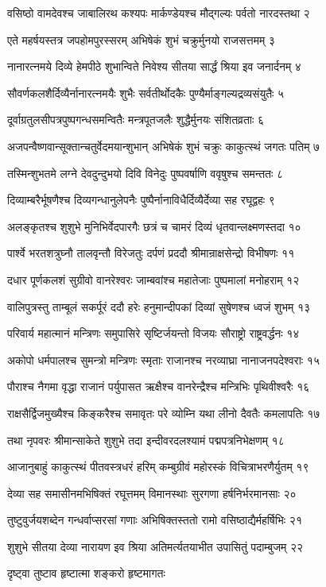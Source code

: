 वसिष्ठो वामदेवश्च जाबालिरथ कश्यपः
मार्कण्डेयश्च मौद्गल्यः पर्वतो नारदस्तथा २

एते महर्षयस्तत्र जपहोमपुरस्सरम्
अभिषेकं शुभं चक्रुर्मुनयो राजसत्तमम् ३

नानारत्नमये दिव्ये हेमपीठे शुभान्विते
निवेश्य सीतया सार्द्धं श्रिया इव जनार्दनम् ४

सौवर्णकलशैर्दिव्यैर्नानारत्नमयैः शुभैः
सर्वतीर्थोदकैः पुण्यैर्माङ्गल्यद्रव्यसंयुतैः ५

दूर्वाग्रतुलसीपत्रपुष्पगन्धसमन्वितैः
मन्त्रपूतजलैः शुद्धैर्मुनयः संशितव्रताः ६

अजपन्वैष्णवान्सूक्तान्चतुर्वेदमयान्शुभान्
अभिषेकं शुभं चक्रुः काकुत्स्थं जगतः पतिम् ७

तस्मिन्शुभतमे लग्ने देवदुन्दुभयो दिवि
विनेदुः पुष्पवर्षाणि ववृषुश्च समन्ततः ८

दिव्याम्बरैर्भूषणैश्च दिव्यगन्धानुलेपनैः
पुष्पैर्नानाविधैर्दिव्यैर्देव्या सह रघूद्वहः ९

अलङ्कृतश्च शुशुभे मुनिभिर्वेदपारगैः
छत्रं च चामरं दिव्यं धृतवान्लक्ष्मणस्तदा १०

पार्श्वे भरतशत्रुघ्नौ तालवृन्तौ विरेजतुः
दर्पणं प्रददौ श्रीमान्राक्षसेन्द्रो विभीषणः ११

दधार पूर्णकलशं सुग्रीवो वानरेश्वरः
जाम्बवांश्च महातेजाः पुष्पमालां मनोहराम् १२

वालिपुत्रस्तु ताम्बूलं सकर्पूरं ददौ हरेः
हनुमान्दीपकां दिव्यां सुषेणश्च ध्वजं शुभम् १३

परिवार्य महात्मानं मन्त्रिणः समुपासिरे
सृष्टिर्जयन्तो विजयः सौराष्ट्रो राष्ट्रवर्द्धनः १४

अकोपो धर्मपालश्च सुमन्त्रो मन्त्रिणः स्मृताः
राजानश्च नरव्याघ्रा नानाजनपदेश्वराः १५

पौराश्च नैगमा वृद्धा राजानं पर्युपासत
ऋक्षैश्च वानरेन्द्रैश्च मन्त्रिभिः पृथिवीश्वरैः १६

राक्षसैर्द्विजमुख्यैश्च किङ्करैश्च समावृतः
परे व्योम्नि यथा लीनो दैवतैः कमलापतिः १७

तथा नृपवरः श्रीमान्साकेते शुशुभे तदा
इन्दीवरदलश्यामं पद्मपत्रनिभेक्षणम् १८

आजानुबाहुं काकुत्स्थं पीतवस्त्रधरं हरिम्
कम्बुग्रीवं महोरस्कं विचित्राभरणैर्युतम् १९

देव्या सह समासीनमभिषिक्तं रघूत्तमम्
विमानस्थाः सुरगणा हर्षनिर्भरमानसाः २०

तुष्टुवुर्जयशब्देन गन्धर्वाप्सरसां गणाः
अभिषिक्तस्ततो रामो वसिष्ठाद्यैर्महर्षिभिः २१

शुशुभे सीतया देव्या नारायण इव श्रिया
अतिमर्त्यतयाभीत उपासितुं पदाम्बुजम् २२

दृष्ट्वा तुष्टाव हृष्टात्मा शङ्करो हृष्टमागतः

